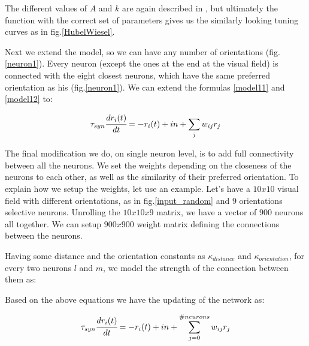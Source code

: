 The different values of $A$ and $k$ are again described in \cite{keemink2015unified}, but ultimately the function with the correct set of parameters gives us the similarly looking tuning curves as in fig.\ref{HubelWiesel}.



Next we extend the model, so we can have any number of orientations (fig.\ref{neuron1}). Every neuron (except the ones at the end at the visual field) is connected with the eight closest neurons, which have the same preferred orientation as his (fig.\ref{neuron1}). We can extend the formulas \ref{model11} and \ref{model12} to:

\begin{equation}
\tau_{syn}\cfrac{dr_{i}(t)}{dt}=-r_{i}(t)+in+\sum_{j} w_{ij}r_{j}
\end{equation}

 

The final modification we do, on single neuron level, is to add full connectivity between all the neurons. We set the weights depending on the closeness of the neurons to each other, as well as the similarity of their preferred orientation. To explain how we setup the weights, let use an example. Let's have a $10x10$ visual field with different orientations, as in fig.\ref{input_random} and $9$ orientations selective neurons. Unrolling the $10x10x9$ matrix, we have a vector of $900$ neurons all together. We can setup $900x900$ weight matrix defining the connections between the neurons. 

Having some distance and the orientation constants as $\kappa_{distance}$ and $\kappa_{orientation}$, for every two neurons $l$ and $m$, we model the strength of the connection between them as:





Based on the above equations we have the updating of the network as:

\begin{equation}
\tau_{syn}\cfrac{dr_{i}(t)}{dt}=-r_{i}(t)+in+\sum_{j=0}^{\#neurons}w_{ij}r_{j}
\end{equation}

